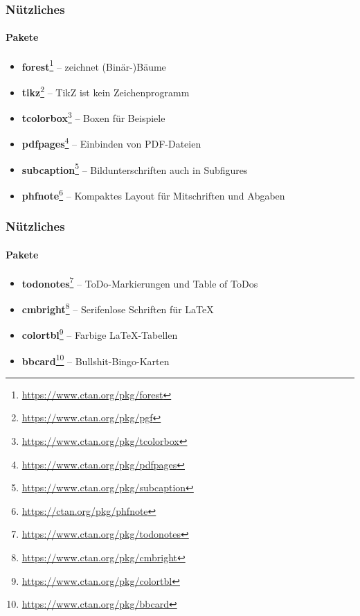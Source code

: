 
\begin{frame}
\frametitle{Nützliches}
\framesubtitle{Pakete}
\begin{itemize}
  \item \textbf{forest}\footnote{\url{https://www.ctan.org/pkg/forest}} -- zeichnet (Binär-)Bäume \\
  \item \textbf{tikz}\footnote{\url{https://www.ctan.org/pkg/pgf}} -- \glqq{}TikZ ist kein Zeichenprogramm\grqq \\
  \item \textbf{tcolorbox}\footnote{\url{https://www.ctan.org/pkg/tcolorbox}} -- Boxen für Beispiele \\
  \item \textbf{pdfpages}\footnote{\url{https://www.ctan.org/pkg/pdfpages}} -- Einbinden von PDF-Dateien \\
  \item \textbf{subcaption}\footnote{\url{https://www.ctan.org/pkg/subcaption}} -- Bildunterschriften auch in Subfigures \\
  \item \textbf{phfnote}\footnote{\url{https://ctan.org/pkg/phfnote}} -- Kompaktes Layout für Mitschriften und Abgaben \\
\end{itemize}
\end{frame}


\begin{frame}
\frametitle{Nützliches}
\framesubtitle{Pakete}
\begin{itemize}
  \item \textbf{todonotes}\footnote{\url{https://www.ctan.org/pkg/todonotes}} -- ToDo-Markierungen und Table of ToDos \\
  \item \textbf{cmbright}\footnote{\url{https://www.ctan.org/pkg/cmbright}} -- Serifenlose Schriften für \LaTeX \\
  \item \textbf{colortbl}\footnote{\url{https://www.ctan.org/pkg/colortbl}} -- Farbige \LaTeX -Tabellen \\
  \item \textbf{bbcard}\footnote{\url{https://www.ctan.org/pkg/bbcard}} -- Bullshit-Bingo-Karten \\
\end{itemize}
\end{frame}

